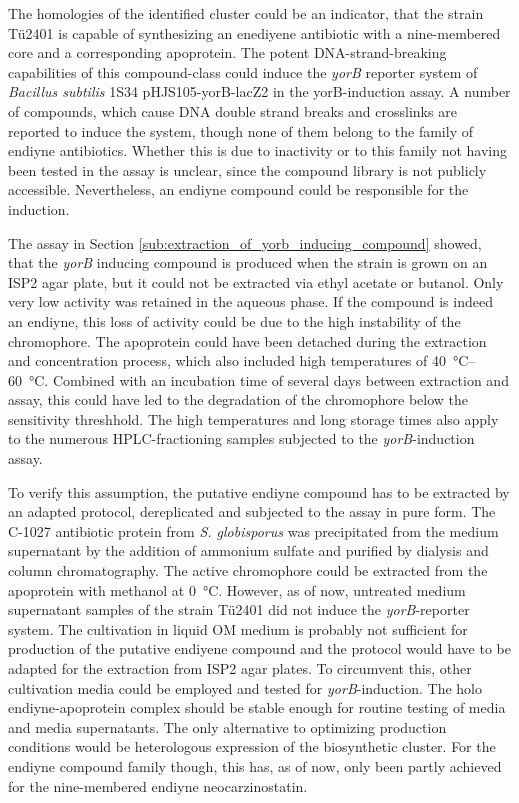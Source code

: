 	 The homologies of the identified cluster could be an indicator, that the strain Tü2401 is capable of synthesizing an enediyene antibiotic with a nine-membered core and a corresponding apoprotein. The potent DNA-strand-breaking capabilities of this compound-class could induce the \textit{yorB} reporter system of \textit{Bacillus subtilis} 1S34 pHJS105-yorB-lacZ2 in the yorB-induction assay. A number of compounds, which cause DNA double strand breaks and crosslinks are reported to induce the system, though none of them belong to the family of endiyne antibiotics. \autocite{Urban2007} Whether this is due to inactivity or to this family not having been tested in the assay is unclear, since the compound library is not publicly accessible. Nevertheless, an endiyne compound could be responsible for the induction.
	 
	 The assay in Section \ref{sub:extraction_of_yorb_inducing_compound} showed, that the \textit{yorB} inducing compound is produced when the strain is grown on an ISP2 agar plate, but it could not be extracted via ethyl acetate or butanol. Only very low activity was retained in the aqueous phase. If the compound is indeed an endiyne, this loss of activity could be due to the high instability of the chromophore. The apoprotein could have been detached during the extraction and concentration process, which also included high temperatures of \SIrange[range-units=single]{40}{60}{\celsius}. Combined with an incubation time of several days between extraction and assay, this could have led to the degradation of the chromophore below the sensitivity threshhold. The high temperatures and long storage times also apply to the numerous HPLC-fractioning samples subjected to the \textit{yorB}-induction assay. 
	 
	 To verify this assumption, the putative endiyne compound has to be extracted by an adapted protocol, dereplicated and subjected to the assay in pure form. The C-1027 antibiotic protein from \textit{S. globisporus} was precipitated from the medium supernatant by the addition of ammonium sulfate and purified by dialysis and column chromatography.\autocite{Otani1988a} The active chromophore could be extracted from the apoprotein with methanol at \SI{0}{\celsius}. \autocite{Matsumoto1993} However, as of now, untreated medium supernatant samples of the strain Tü2401 did not induce the \textit{yorB}-reporter system. The cultivation in liquid OM medium is probably not sufficient for production of the putative endiyene compound and the protocol would have to be adapted for the extraction from ISP2 agar plates. To circumvent this, other cultivation media could be employed and tested for \textit{yorB}-induction. The holo endiyne-apoprotein complex should be stable enough for routine testing of media and media supernatants. The only alternative to optimizing production conditions would be heterologous expression of the biosynthetic cluster. For the endiyne compound family though, this has, as of now, only been partly achieved for the nine-membered endiyne neocarzinostatin.\autocite{Zhang2008}
	 


